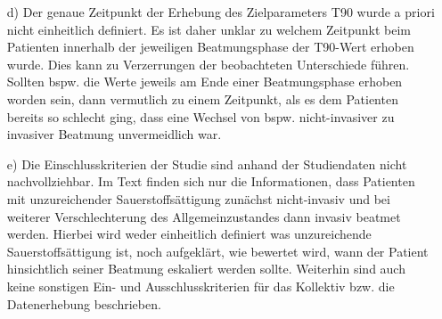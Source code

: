 \documentclass{scrartcl}
\theoremstyle{definition}
\theoremstyle{remark}
\begin{document}
\begin{enumerate}
	\item[d) ]Der genaue Zeitpunkt der Erhebung des Zielparameters T90 wurde a priori nicht einheitlich definiert. Es ist daher unklar zu welchem Zeitpunkt beim Patienten innerhalb der jeweiligen Beatmungsphase der T90-Wert erhoben wurde. Dies kann zu Verzerrungen der beobachteten Unterschiede führen. Sollten bspw. die Werte jeweils am Ende einer Beatmungsphase erhoben worden sein, dann vermutlich zu einem Zeitpunkt, als es dem Patienten bereits so schlecht ging, dass eine Wechsel von bspw. nicht-invasiver zu invasiver Beatmung unvermeidlich war. 
	\item[e) ] Die Einschlusskriterien der Studie sind anhand der Studiendaten nicht nachvollziehbar. Im Text finden sich nur die Informationen, dass Patienten mit unzureichender Sauerstoffsättigung zunächst nicht-invasiv und bei weiterer Verschlechterung des Allgemeinzustandes dann invasiv beatmet werden. Hierbei wird weder einheitlich definiert was unzureichende Sauerstoffsättigung ist, noch aufgeklärt, wie bewertet wird, wann der Patient hinsichtlich seiner Beatmung eskaliert werden sollte. Weiterhin sind auch keine sonstigen Ein- und Ausschlusskriterien für das Kollektiv bzw. die Datenerhebung beschrieben.   
\end{enumerate}
\end{document}
